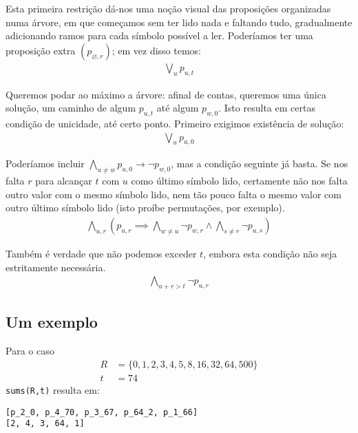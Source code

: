 \documentclass[a4paper,12pt]{article}
\theoremstyle{definition}
\theoremstyle{theorem}
\theoremstyle{remark}
\begin{document}
Esta primeira restrição dá-nos uma noção visual das proposições organizadas
numa árvore, em que começamos sem ter lido nada e faltando tudo,
gradualmente adicionando ramos para cada símbolo possível a ler.
Poderíamos ter uma proposição extra $(p_{\varnothing,r})$; em vez
      disso temos:
\begin{align}
   \bigvee_{u} p_{u,t}
\end{align}

Queremos podar ao máximo a árvore: afinal de contas, queremos uma
única solução, um
caminho de algum $p_{u,t}$ até algum $p_{w,0}$.
Isto resulta em certas condição de unicidade, até certo ponto.
 Primeiro exigimos existência de solução:
\begin{align}
   \bigvee_{u} p_{u,0}
\end{align}

Poderíamos incluir $\bigwedge_{u\neq w} p_{u,0}\to\lnot p_{w,0}$, mas
a condição seguinte já basta.
Se nos falta $r$ para alcançar $t$ com $u$ como último símbolo lido,
certamente não nos falta outro valor com o mesmo símbolo lido,
nem tão pouco falta o mesmo valor com outro último símbolo lido
(isto proíbe permutações, por exemplo).
\begin{align}
      \bigwedge_{u,r}\left( p_{u,r}
   \implies
      \bigwedge_{w\neq u}\lnot p_{w,r}
         \land
      \bigwedge_{s\neq r}\lnot p_{u,s}
   \right)
\end{align}

Também é verdade que não podemos exceder $t$, embora esta condição não seja
estritamente necessária.
\begin{align}
   \bigwedge_{u+r>t} \lnot p_{u,r}
\end{align}

\subsection{Um exemplo}
Para o caso
\begin{align*}
   R&=\{0,1,2,3,4,5,8,16,32,64,500\}\\
   t&=74
\end{align*}
\texttt{sums(R,t)} resulta
em:
\begin{verbatim}
[p_2_0, p_4_70, p_3_67, p_64_2, p_1_66]
[2, 4, 3, 64, 1]
\end{verbatim}
\end{document}
